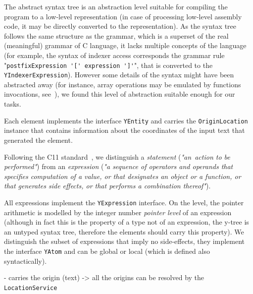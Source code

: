 The abstract syntax tree \ytree{} is an abstraction level suitable for compiling the program to a low-level representation (in case of processing low-level assembly code, it may be directly converted to the \xgraph{} representation).
As the  syntax tree follows the same structure as the grammar, which is a superset of the real (meaningful) grammar of C language, it lacks multiple concepts of the language (for example, the syntax of indexer access corresponds the grammar rule "\lstinline{postfixExpression '[' expression ']'}", that is converted to the \texttt{YIndexerExpression}).
However some details of the syntax might have been abstracted away (for instance, array operations may be emulated by functions invocations, see~\cite[Chapter 5]{gries2012science}), we found this level of abstraction suitable enough for our tasks.

Each \ytree{} element implements the interface \texttt{YEntity} and carries the \texttt{OriginLocation} %
instance that contains information about the coordinates of the input text that generated the \ytree{} element.

Following the C11 standard~\cite{iso2012iec}, we distinguish a \textit{statement} (\textit{"an~action to be performed"}) from an \textit{expression} (\textit{"a sequence of operators and operands that specifies computation of a value, or that designates an object or a function, or that generates side effects, or that performs a combination thereof"}).

All \ytree{} expressions implement the \texttt{YExpression} interface.
On the \ytree{} level, the pointer arithmetic is modelled by the integer number \textit{pointer level} of an expression (although in fact this is the property of a type not of an expression, the y-tree is an untyped syntax tree, therefore the elements \ytree{} should carry this property).
We distinguish the subset of expressions that imply no side-effects, they implement the interface \texttt{YAtom} and can be global or local (which is defined also syntactically).

- carries the origin (text) -> all the origins can be resolved by the \texttt{LocationService} %

